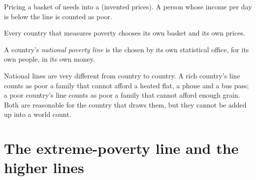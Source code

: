\begin{omfigure}

{\small Pricing a basket of needs into a  (invented prices). A person
whose income per day is below the line is counted as poor.}
\end{omfigure}

Every country that measures poverty chooses its own basket and its own prices.

\begin{definition}\label{def:g6:poverty:national-poverty-line}
A country's \emph{national poverty line} is the
 chosen by its own statistical office, for its own people, in its
own money.
\end{definition}

National lines are very different from country to country. A rich country's
line counts as poor a family that cannot afford a heated flat, a phone and
a bus pass; a poor country's line counts as poor a family that cannot afford
enough grain. Both are reasonable for the country that draws them, but they
cannot be added up into a world count.

\section{The extreme-poverty line and the higher lines}

